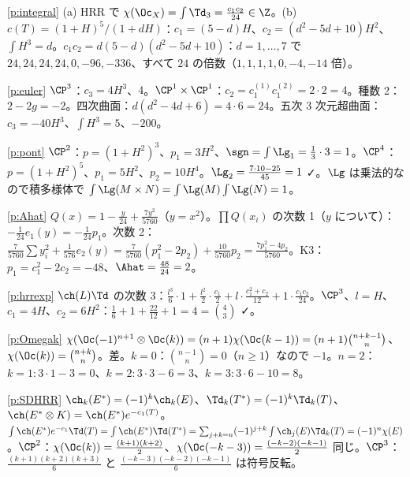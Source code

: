 \begin{sol}{\ref{p:integral}}
(a) HRR で $\chi(\Oc_X)=\int\Td_3=\frac{c_1c_2}{24}\in\Z$。(b) $c(T)=(1+H)^5/(1+dH)$：$c_1=(5-d)H$、$c_2=(d^2-5d+10)H^2$、$\int H^3=d$。$c_1c_2=d(5-d)(d^2-5d+10)$：$d=1,\dots,7$ で $24,24,24,24,0,-96,-336$、すべて $24$ の倍数（$1,1,1,1,0,-4,-14$ 倍）。
\end{sol}
\begin{sol}{\ref{p:euler}}
$\CP^3$：$c_3=4H^3$、$4$。$\CP^1\times\CP^1$：$c_2=c_1^{(1)}c_1^{(2)}=2\cdot2=4$。種数 2：$2-2g=-2$。四次曲面：$d(d^2-4d+6)=4\cdot6=24$。五次 3 次元超曲面：$c_3=-40H^3$、$\int H^3=5$、$-200$。
\end{sol}
\begin{sol}{\ref{p:pont}}
$\CP^2$：$p=(1+H^2)^3$、$p_1=3H^2$、$\sgn=\int\Lg_1=\frac13\cdot3=1$。$\CP^4$：$p=(1+H^2)^5$、$p_1=5H^2$、$p_2=10H^4$。$\Lg_2=\frac{7\cdot10-25}{45}=1$ ✓。$\Lg$ は乗法的なので積多様体で $\int\Lg(M\times N)=\int\Lg(M)\int\Lg(N)=1$。
\end{sol}
\begin{sol}{\ref{p:Ahat}}
$Q(x)=1-\frac{y}{24}+\frac{7y^2}{5760}$（$y=x^2$）。$\prod Q(x_i)$ の次数 1（$y$ について）：$-\frac1{24}e_1(y)=-\frac1{24}p_1$。次数 2：$\frac7{5760}\sum y_i^2+\frac1{576}e_2(y)=\frac7{5760}(p_1^2-2p_2)+\frac{10}{5760}p_2=\frac{7p_1^2-4p_2}{5760}$。K3：$p_1=c_1^2-2c_2=-48$、$\Ahat=\frac{48}{24}=2$。
\end{sol}
\begin{sol}{\ref{p:hrrexp}}
$\ch(L)\Td$ の次数 3：$\frac{l^3}6\cdot1+\frac{l^2}2\cdot\frac{c_1}2+l\cdot\frac{c_1^2+c_2}{12}+1\cdot\frac{c_1c_2}{24}$。$\CP^3$、$l=H$、$c_1=4H$、$c_2=6H^2$：$\frac16+1+\frac{22}{12}+1=4=\binom43$ ✓。
\end{sol}
\begin{sol}{\ref{p:Omegak}}
$\chi(\Oc(-1)^{n+1}\otimes\Oc(k))=(n+1)\chi(\Oc(k-1))=(n+1)\binom{n+k-1}n$、$\chi(\Oc(k))=\binom{n+k}n$。差。$k=0$：$\binom{n-1}n=0$（$n\ge1$）なので $-1$。$n=2$：$k=1:3\cdot1-3=0$、$k=2:3\cdot3-6=3$、$k=3:3\cdot6-10=8$。
\end{sol}
\begin{sol}{\ref{p:SDHRR}}
$\ch_k(E^*)=(-1)^k\ch_k(E)$、$\Td_k(T^*)=(-1)^k\Td_k(T)$、$\ch(E^*\otimes K)=\ch(E^*)e^{-c_1(T)}$。$\int\ch(E^*)e^{-c_1}\Td(T)=\int\ch(E^*)\Td(T^*)=\sum_{j+k=n}(-1)^{j+k}\int\ch_j(E)\Td_k(T)=(-1)^n\chi(E)$。$\CP^2$：$\chi(\Oc(k))=\frac{(k+1)(k+2)}2$、$\chi(\Oc(-k-3))=\frac{(-k-2)(-k-1)}2$ 同じ。$\CP^3$：$\frac{(k+1)(k+2)(k+3)}6$ と $\frac{(-k-3)(-k-2)(-k-1)}6$ は符号反転。
\end{sol}
